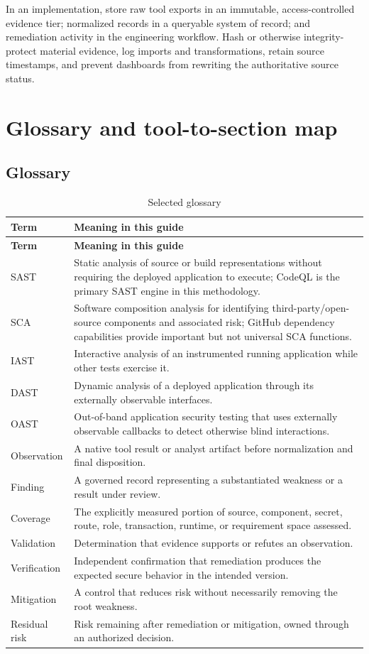 \documentclass[11pt,letterpaper]{article}
\begin{document}
In an implementation, store raw tool exports in an immutable, access-controlled evidence tier; normalized records in a queryable system of record; and remediation activity in the engineering workflow. Hash or otherwise integrity-protect material evidence, log imports and transformations, retain source timestamps, and prevent dashboards from rewriting the authoritative source status.

\section{Glossary and tool-to-section map}

\subsection{Glossary}

\begin{longtable}{@{}L{1.15in}L{5.5in}@{}}
\caption{Selected glossary}\label{tab:glossary}\\
\toprule
\textbf{Term} & \textbf{Meaning in this guide} \\
\midrule
\endfirsthead
\toprule
\textbf{Term} & \textbf{Meaning in this guide} \\
\midrule
\endhead
SAST & Static analysis of source or build representations without requiring the deployed application to execute; CodeQL is the primary SAST engine in this methodology. \\
SCA & Software composition analysis for identifying third-party/open-source components and associated risk; GitHub dependency capabilities provide important but not universal SCA functions. \\
IAST & Interactive analysis of an instrumented running application while other tests exercise it. \\
DAST & Dynamic analysis of a deployed application through its externally observable interfaces. \\
OAST & Out-of-band application security testing that uses externally observable callbacks to detect otherwise blind interactions. \\
Observation & A native tool result or analyst artifact before normalization and final disposition. \\
Finding & A governed record representing a substantiated weakness or a result under review. \\
Coverage & The explicitly measured portion of source, component, secret, route, role, transaction, runtime, or requirement space assessed. \\
Validation & Determination that evidence supports or refutes an observation. \\
Verification & Independent confirmation that remediation produces the expected secure behavior in the intended version. \\
Mitigation & A control that reduces risk without necessarily removing the root weakness. \\
Residual risk & Risk remaining after remediation or mitigation, owned through an authorized decision. \\
\bottomrule
\end{longtable}
\end{document}
